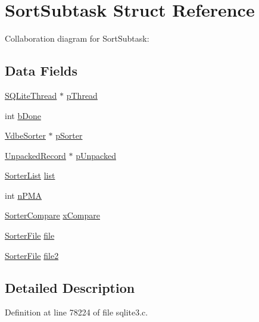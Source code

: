 \hypertarget{struct_sort_subtask}{}\section{Sort\+Subtask Struct Reference}
\label{struct_sort_subtask}


Collaboration diagram for Sort\+Subtask\+:
\subsection*{Data Fields}
\begin{DoxyCompactItemize}
\item 
\hyperlink{struct_s_q_lite_thread}{S\+Q\+Lite\+Thread} $\ast$ \hyperlink{struct_sort_subtask_ab61bdcad5ba38805599ca4a3858fccd8}{p\+Thread}
\item 
int \hyperlink{struct_sort_subtask_a2bdd020d727ee274453933c1fc07317b}{b\+Done}
\item 
\hyperlink{struct_vdbe_sorter}{Vdbe\+Sorter} $\ast$ \hyperlink{struct_sort_subtask_a4be97d7a48d4328b3f5339ebf2d6aa25}{p\+Sorter}
\item 
\hyperlink{struct_unpacked_record}{Unpacked\+Record} $\ast$ \hyperlink{struct_sort_subtask_a3c35478dbef83c35370e3230491c4a87}{p\+Unpacked}
\item 
\hyperlink{struct_sorter_list}{Sorter\+List} \hyperlink{struct_sort_subtask_a0b728adf85f50e92f631147bac5f46ac}{list}
\item 
int \hyperlink{struct_sort_subtask_aa69ed0840e0aa406ab50b37e580957c7}{n\+P\+M\+A}
\item 
\hyperlink{sqlite3_8c_ac3335601a56c94e8113535d5349541a0}{Sorter\+Compare} \hyperlink{struct_sort_subtask_a6dc03188d984469cb2fff10d3eebc78f}{x\+Compare}
\item 
\hyperlink{struct_sorter_file}{Sorter\+File} \hyperlink{struct_sort_subtask_ae256a788a6c676ec0d1caa2ad8d57b73}{file}
\item 
\hyperlink{struct_sorter_file}{Sorter\+File} \hyperlink{struct_sort_subtask_a4f1ec1d2d2073a19bdc2110325a6a070}{file2}
\end{DoxyCompactItemize}


\subsection{Detailed Description}


Definition at line 78224 of file sqlite3.\+c.



